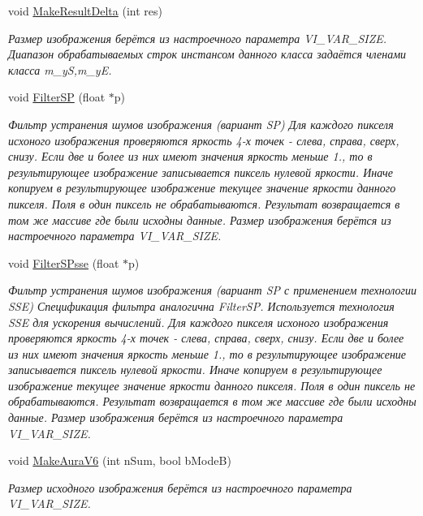 \begin{DoxyCompactItemize}
void \hyperlink{class_c_v_i_engine_thread_ab6c4ea18d353a7dc00aa1698c379afde}{Make\+Result\+Delta} (int res)
\begin{DoxyCompactList}\small\item\em Размер изображения берётся из настроечного параметра V\+I\+\_\+\+V\+A\+R\+\_\+\+S\+I\+Z\+E. Диапазон обрабатываемых строк инстансом данного класса задаётся членами класса m\+\_\+y\+S,m\+\_\+y\+E. \end{DoxyCompactList}\item 
void \hyperlink{class_c_v_i_engine_thread_a7e13a627c4b748b2a897e5cfb314f0a2}{Filter\+S\+P} (float $\ast$p)
\begin{DoxyCompactList}\small\item\em Фильтр устранения шумов изображения (вариант S\+P) Для каждого пикселя исхоного изображения проверяются яркость 4-\/х точек -\/ слева, справа, сверх, снизу. Если две и более из них имеют значения яркость меньше 1., то в результирующее изображение записывается пиксель нулевой яркости. Иначе копируем в результирующее изображение текущее значение яркости данного пикселя. Поля в один пиксель не обрабатываются. Результат возвращается в том же массиве где были исходны данные. Размер изображения берётся из настроечного параметра V\+I\+\_\+\+V\+A\+R\+\_\+\+S\+I\+Z\+E. \end{DoxyCompactList}\item 
void \hyperlink{class_c_v_i_engine_thread_a900848dc88ad3445296cbd72c467875c}{Filter\+S\+Psse} (float $\ast$p)
\begin{DoxyCompactList}\small\item\em Фильтр устранения шумов изображения (вариант S\+P с применением технологии S\+S\+E) Спецификация фильтра аналогична Filter\+S\+P. Используется технология S\+S\+E для ускорения вычислений. Для каждого пикселя исхоного изображения проверяются яркость 4-\/х точек -\/ слева, справа, сверх, снизу. Если две и более из них имеют значения яркость меньше 1., то в результирующее изображение записывается пиксель нулевой яркости. Иначе копируем в результирующее изображение текущее значение яркости данного пикселя. Поля в один пиксель не обрабатываются. Результат возвращается в том же массиве где были исходны данные. Размер изображения берётся из настроечного параметра V\+I\+\_\+\+V\+A\+R\+\_\+\+S\+I\+Z\+E. \end{DoxyCompactList}\item 
void \hyperlink{class_c_v_i_engine_thread_a138c31012cd6924325231acdd4fbba49}{Make\+Aura\+V6} (int n\+Sum, bool b\+Mode\+B)
\begin{DoxyCompactList}\small\item\em Размер исходного изображения берётся из настроечного параметра V\+I\+\_\+\+V\+A\+R\+\_\+\+S\+I\+Z\+E. \end{DoxyCompactList}\item 

\end{DoxyCompactItemize}
